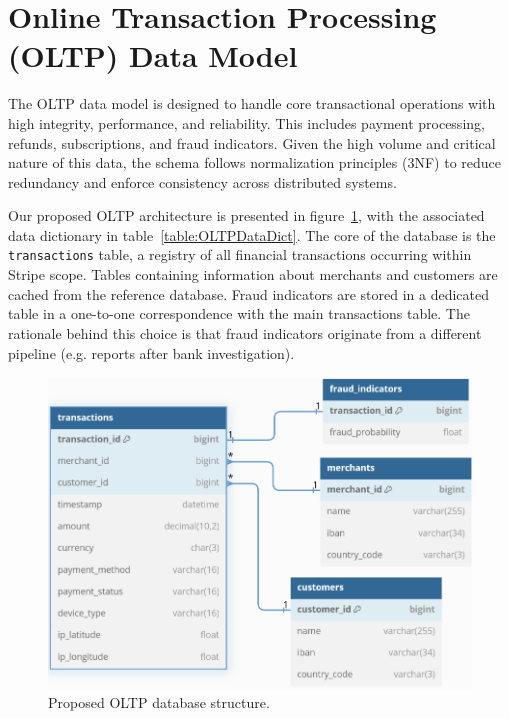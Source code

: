 \documentclass[11pt,a4paper,computermodern]{article}
\newcommand{\code}{\texttt}
\begin{document}
\clearpage
\section*{Online Transaction Processing (OLTP) Data Model}

The OLTP data model is designed to handle core transactional operations with high integrity, performance, and reliability. This includes payment processing, refunds, subscriptions, and fraud indicators. Given the high volume and critical nature of this data, the schema follows normalization principles (3NF) to reduce redundancy and enforce consistency across distributed systems.

Our proposed OLTP architecture is presented in figure~\ref{fig:OLTP}, with the associated data dictionary in table~\ref{table:OLTPDataDict}. The core of the database is the \code{transactions} table, a registry of all financial transactions occurring within Stripe scope. Tables containing information about merchants and customers are cached from the reference database. Fraud indicators are stored in a dedicated table in a one-to-one correspondence with the main transactions table. The rationale behind this choice is that fraud indicators originate from a different pipeline (e.g. reports after bank investigation).


\begin{figure}[!htb]
	\centering
	\includegraphics[scale=0.7]{./figures/OLTP}
	\caption{Proposed OLTP database structure.}
	\label{fig:OLTP}
\end{figure}
\end{document}
